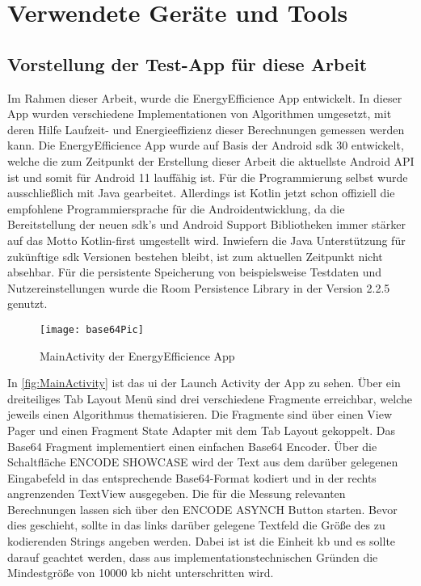 \chapter{Verwendete Geräte und Tools}
\section{Vorstellung der Test-App für diese Arbeit}
Im Rahmen dieser Arbeit, wurde die \glqq EnergyEfficience\grqq{} App entwickelt. In dieser App wurden verschiedene Implementationen von Algorithmen umgesetzt, mit deren Hilfe Laufzeit- und Energieeffizienz dieser Berechnungen gemessen werden kann.
Die \glqq EnergyEfficience\grqq{} App wurde auf Basis der Android \ac{sdk} 30 entwickelt, welche die zum Zeitpunkt der Erstellung dieser Arbeit die aktuellste Android API ist und somit für Android 11 lauffähig ist. Für die Programmierung selbst wurde ausschließlich mit Java gearbeitet. Allerdings ist Kotlin jetzt schon offiziell die empfohlene Programmiersprache für die Androidentwicklung, da die Bereitstellung der neuen \ac{sdk}'s und Android Support Bibliotheken immer stärker auf das Motto \glqq Kotlin-first\grqq{} \cite{kotlin-first} umgestellt wird. Inwiefern die Java Unterstützung für zukünftige \ac{sdk} Versionen bestehen bleibt, ist zum aktuellen Zeitpunkt nicht absehbar.
Für die persistente Speicherung von beispielsweise Testdaten und Nutzereinstellungen wurde die Room Persistence Library in der Version 2.2.5 genutzt.
\begin{figure}[H]
	\begin{center}	 
	\texttt{[image: base64Pic]}
	\caption{MainActivity der EnergyEfficience App}
	\label{fig:MainActivity} 
	\end{center}
\end{figure}
In \autoref{fig:MainActivity} ist das \ac{ui} der Launch Activity der App zu sehen. Über ein dreiteiliges Tab Layout Menü sind drei verschiedene Fragmente erreichbar, welche jeweils einen Algorithmus thematisieren. Die Fragmente sind über einen View Pager und einen Fragment State Adapter mit dem Tab Layout gekoppelt. Das Base64 Fragment implementiert einen einfachen Base64 Encoder. Über die Schaltfläche \glqq ENCODE SHOWCASE\grqq{} wird der Text aus dem darüber gelegenen Eingabefeld in das entsprechende Base64-Format kodiert und in der rechts angrenzenden TextView ausgegeben. Die für die Messung relevanten Berechnungen lassen sich über den \glqq ENCODE ASYNCH\grqq{} Button starten. Bevor dies geschieht, sollte in das links darüber gelegene Textfeld die Größe des zu kodierenden Strings angeben werden. Dabei ist ist die Einheit \ac{kb} und es sollte darauf geachtet werden, dass aus implementationstechnischen Gründen die Mindestgröße von 10000 \ac{kb} nicht unterschritten wird. 
